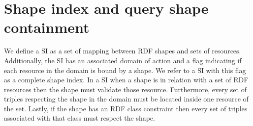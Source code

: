 \section{Shape index and query shape containment}

We define a SI as a set of mapping between RDF shapes and sets of resources.
Additionally, the SI has an associated domain of action
and a flag indicating if each resource in the domain is bound by a shape. 
We refer to a SI with this flag as a complete shape index.
In a SI when a shape is in relation with a set of RDF resources then the shape must validate those resource.
Furthermore, every set of triples respecting the shape in the domain must be located inside one resource of the set.
Lastly, if the shape has an RDF class constraint
then every set of triples associated with that class must respect the shape.


